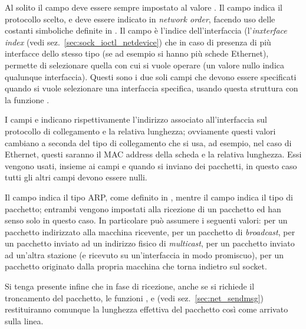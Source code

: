 Al solito il campo  deve essere sempre impostato al valore
. Il campo  indica il protocollo scelto,
e deve essere indicato in \textit{network order}, facendo uso delle costanti
simboliche definite in . Il campo  è
l'indice dell'interfaccia (l'\textit{inxterface index} (vedi
sez.~\ref{sec:sock_ioctl_netdevice}) che in caso di presenza di più
interfacce dello stesso tipo (se ad esempio si hanno più schede Ethernet),
permette di selezionare quella con cui si vuole operare (un valore nullo
indica qualunque interfaccia).  Questi sono i due soli campi che devono essere
specificati quando si vuole selezionare una interfaccia specifica, usando
questa struttura con la funzione .

I campi  e  indicano rispettivamente
l'indirizzo associato all'interfaccia sul protocollo di collegamento e la
relativa lunghezza; ovviamente questi valori cambiano a seconda del tipo di
collegamento che si usa, ad esempio, nel caso di Ethernet, questi saranno il
MAC address della scheda e la relativa lunghezza. Essi vengono usati, insieme
ai campi  e  quando si inviano dei
pacchetti, in questo caso tutti gli altri campi devono essere nulli.

Il campo  indica il tipo ARP, come definito in
, mentre il campo  indica il tipo di
pacchetto; entrambi vengono impostati alla ricezione di un pacchetto ed han
senso solo in questo caso. In particolare  può assumere i
seguenti valori:  per un pacchetto indirizzato alla
macchina ricevente,  per un pacchetto di
\textit{broadcast},  per un pacchetto inviato ad un
indirizzo fisico di \textit{multicast},  per un
pacchetto inviato ad un'altra stazione (e ricevuto su un'interfaccia in modo
promiscuo),  per un pacchetto originato dalla propria
macchina che torna indietro sul socket.

Si tenga presente infine che in fase di ricezione, anche se si richiede il
troncamento del pacchetto, le funzioni ,  e
 (vedi sez.~\ref{sec:net_sendmsg}) restituiranno comunque la
lunghezza effettiva del pacchetto così come arrivato sulla linea.

 
